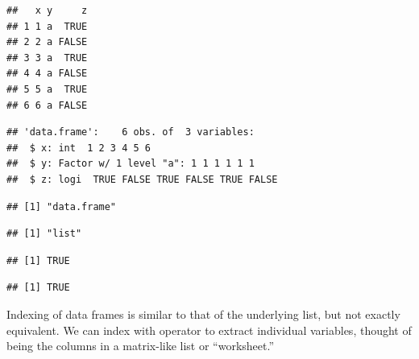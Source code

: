 \documentclass[krantz2]{krantz}\usepackage{knitr}
\begin{document}
\begin{knitrout}\footnotesize
{}\color{fgcolor}\begin{kframe}
\begin{alltt}
 \hlkwb{<-} \hlstd{(} \hlstd{=} \hlopt{:}\hlstd{,}  \hlstd{=} \hlstd{,}  \hlstd{=} \hlstd{(}\hlstd{,} \hlstd{))}
\end{alltt}
\begin{verbatim}
##   x y     z
## 1 1 a  TRUE
## 2 2 a FALSE
## 3 3 a  TRUE
## 4 4 a FALSE
## 5 5 a  TRUE
## 6 6 a FALSE
\end{verbatim}
\begin{alltt}
\end{alltt}
\begin{verbatim}
## 'data.frame':	6 obs. of  3 variables:
##  $ x: int  1 2 3 4 5 6
##  $ y: Factor w/ 1 level "a": 1 1 1 1 1 1
##  $ z: logi  TRUE FALSE TRUE FALSE TRUE FALSE
\end{verbatim}
\begin{alltt}
\end{alltt}
\begin{verbatim}
## [1] "data.frame"
\end{verbatim}
\begin{alltt}
\end{alltt}
\begin{verbatim}
## [1] "list"
\end{verbatim}
\begin{alltt}
\end{alltt}
\begin{verbatim}
## [1] TRUE
\end{verbatim}
\begin{alltt}
\end{alltt}
\begin{verbatim}
## [1] TRUE
\end{verbatim}
\end{kframe}
\end{knitrout}

Indexing of data frames is similar to that of the underlying list, but not exactly equivalent. We can index with operator \Roperator{[[]]} to extract individual variables, thought of being the columns in a matrix-like list or ``worksheet.''
\end{document}
